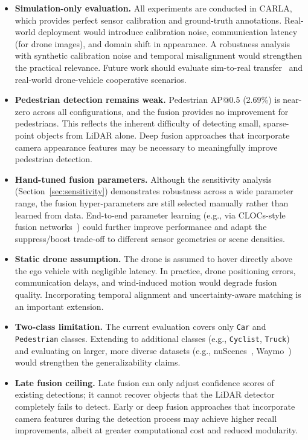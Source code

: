 \documentclass[sustainability,article,submit,moreauthors,pdftex]{Definitions/mdpi}
\begin{document}
\begin{itemize}[leftmargin=*,labelsep=5.8mm]
\item \textbf{Simulation-only evaluation.} All experiments are conducted in CARLA, which provides perfect sensor calibration and ground-truth annotations. Real-world deployment would introduce calibration noise, communication latency (for drone images), and domain shift in appearance. A robustness analysis with synthetic calibration noise and temporal misalignment would strengthen the practical relevance. Future work should evaluate sim-to-real transfer~\cite{yue2019domain} and real-world drone-vehicle cooperative scenarios.

\item \textbf{Pedestrian detection remains weak.} Pedestrian AP@0.5 (2.69\%) is near-zero across all configurations, and the fusion provides no improvement for pedestrians. This reflects the inherent difficulty of detecting small, sparse-point objects from LiDAR alone. Deep fusion approaches that incorporate camera appearance features may be necessary to meaningfully improve pedestrian detection.

\item \textbf{Hand-tuned fusion parameters.} Although the sensitivity analysis (Section~\ref{sec:sensitivity}) demonstrates robustness across a wide parameter range, the fusion hyper-parameters are still selected manually rather than learned from data. End-to-end parameter learning (e.g., via CLOCs-style fusion networks~\cite{pang2020clocs}) could further improve performance and adapt the suppress/boost trade-off to different sensor geometries or scene densities.

\item \textbf{Static drone assumption.} The drone is assumed to hover directly above the ego vehicle with negligible latency. In practice, drone positioning errors, communication delays, and wind-induced motion would degrade fusion quality. Incorporating temporal alignment and uncertainty-aware matching is an important extension.

\item \textbf{Two-class limitation.} The current evaluation covers only \texttt{Car} and \texttt{Pedestrian} classes. Extending to additional classes (e.g., \texttt{Cyclist}, \texttt{Truck}) and evaluating on larger, more diverse datasets (e.g., nuScenes~\cite{caesar2020nuscenes}, Waymo~\cite{sun2020waymo}) would strengthen the generalizability claims.

\item \textbf{Late fusion ceiling.} Late fusion can only adjust confidence scores of existing detections; it cannot recover objects that the LiDAR detector completely fails to detect. Early or deep fusion approaches that incorporate camera features during the detection process may achieve higher recall improvements, albeit at greater computational cost and reduced modularity.
\end{itemize}
\end{document}
